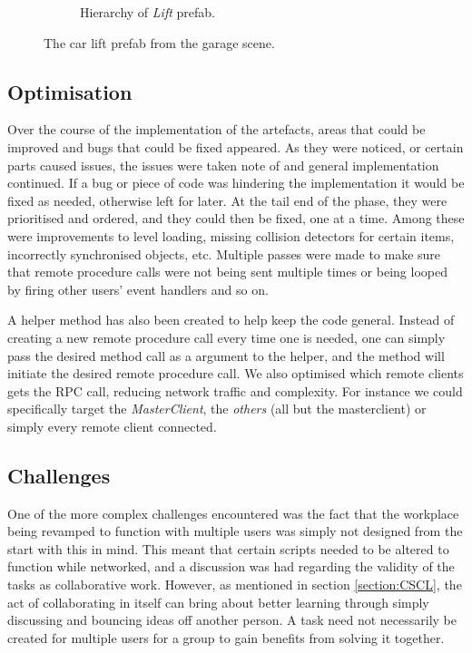 \begin{figure}[H]
\begin{subfigure}[b]{0.28\textwidth}
    \caption{Hierarchy of \textit{Lift} prefab.}
    \label{fig:carliftTree}
  \end{subfigure}
  \hfill%
  \caption{The car lift prefab from the garage scene.}
  \label{fig:phase2CarLift}
\end{figure}


\subsection{Optimisation} \label{subsec:Optimisation}
Over the course of the implementation of the artefacts, areas that could be improved and bugs that could be fixed appeared. As they were noticed, or certain parts caused issues, the issues were taken note of and general implementation continued. If a bug or piece of code was hindering the implementation it would be fixed as needed, otherwise left for later. At the tail end of the phase, they were prioritised and ordered, and they could then be fixed, one at a time. Among these were improvements to level loading, missing collision detectors for certain items, incorrectly synchronised objects, etc. Multiple passes were made to make sure that remote procedure calls were not being sent multiple times or being looped by firing other users' event handlers and so on. 

A helper method has also been created to help keep the code general. Instead of creating a new remote procedure call every time one is needed, one can simply pass the desired method call as a argument to the helper, and the method will initiate the desired remote procedure call. We also optimised which remote clients gets the RPC call, reducing network traffic and complexity. For instance we could specifically target the \textit{MasterClient}, the \textit{others} (all but the masterclient) or simply every remote client connected.     



\subsection{Challenges}
One of the more complex challenges encountered was the fact that the workplace being revamped to function with multiple users was simply not designed from the start with this in mind. This meant that certain scripts needed to be altered to function while networked, and a discussion was had regarding the validity of the tasks as collaborative work. However, as mentioned in section \ref{section:CSCL}, the act of collaborating in itself can bring about better learning through simply discussing and bouncing ideas off another person. A task need not necessarily be created for multiple users for a group to gain benefits from solving it together.

